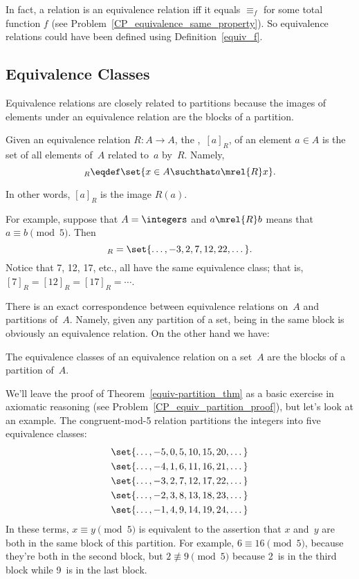 In fact, a relation is an equivalence relation iff it equals $\equiv_f$
for some total function $f$ (see
Problem~\ref{CP_equivalence_same_property}).  So equivalence relations
could have been defined using Definition~\ref{equiv_f}.

\subsection{Equivalence Classes}

Equivalence relations are closely related to partitions because
the images of elements under an equivalence relation are the blocks of
a partition.

\begin{definition}\label{def:equiv_class}
Given an equivalence relation $R : A \to A$, the ,~$[a]_R$, of an element $a \in A$  is the set of all elements of~$A$
related to~$a$ by~$R$.  Namely,
\begin{equation*}
    [a]_R \eqdef \set{x \in A \suchthat a \mrel{R} x}.
\end{equation*}
\end{definition}
In other words, $[a]_R$ is the image $R(a)$.

For example, suppose that $A = \integers$ and $a \mrel{R} b$ means
that $a \equiv b \pmod{5}$.  Then
\begin{equation*}
    [7]_R = \set{\dots, -3, 2, 7, 12, 22, \dots}.
\end{equation*}
Notice that 7, 12, 17, etc., all have the same equivalence class; that
is, $[7]_R = [12]_R = [17]_R = \cdots$.

There is an exact correspondence between equivalence relations on~$A$
and partitions of~$A$.  Namely, given any partition of a set,
being in the same block is obviously an equivalence relation.  On the
other hand we have:
\begin{theorem}\label{equiv-partition_thm}
The equivalence classes of an equivalence relation on a set~$A$ are
the blocks of a partition of~$A$.
\end{theorem}

We'll leave the proof of Theorem~\ref{equiv-partition_thm} as a basic
exercise in axiomatic reasoning (see
Problem~\ref{CP_equiv_partition_proof}), but let's look at an example.
The congruent-mod-5 relation partitions the integers into five
equivalence classes:
\begin{gather*}
    \set{ \dots, -5, 0, 5, 10, 15, 20, \dots } \\
    \set{ \dots, -4, 1, 6, 11, 16, 21, \dots } \\
    \set{ \dots, -3, 2, 7, 12, 17, 22, \dots } \\
    \set{ \dots, -2, 3, 8, 13, 18, 23, \dots } \\
    \set{ \dots, -1, 4, 9, 14, 19, 24, \dots }
\end{gather*}
In these terms, $x \equiv y \pmod{5}$ is equivalent to the assertion
that $x$ and~$y$ are both in the same block of this partition.  For
example, $6 \equiv 16 \pmod{5}$, because they're both in the second
block, but $2 \not\equiv 9 \pmod{5}$ because 2~is in the third block
while 9~is in the last block.

